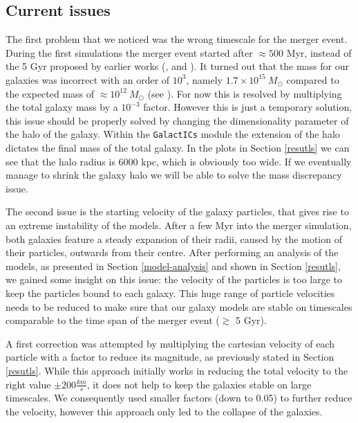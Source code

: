 \documentclass[a4paper,12pt, english]{article}
\begin{document}
\subsection{Current issues}
The first problem that we noticed was the wrong timescale for the merger event. During the first simulations the merger event started after \(\approx 500\) Myr, instead of the 5 Gyr proposed by earlier works (\textcite{Cox_2008},\textcite{van_der_Marel_2019} and \textcite{Schiavi_2019}). It turned out that the mass for our galaxies was incorrect with an order of $10^3$, namely \(1.7 \times 10^{15}\: M_{\odot}\) compared to the expected mass of \(\approx 10^{12}\: M_{\odot}\) (see \textcite{Watkins_2019}). For now this is resolved by multiplying the total galaxy mass by a  $10^{-3}$ factor. However this is just a temporary solution, this issue should be properly solved by changing the dimensionality parameter of the halo of the galaxy. Within the \texttt{GalactICs} module the extension of the halo dictates the final mass of the total galaxy. In the plots in Section \ref{resutls} we can see that the halo radius is 6000 kpc, which is obviously too wide. If we eventually manage to shrink the galaxy halo we will be able to solve the mass discrepancy issue.\par
\smallskip
The second issue is the starting velocity of the galaxy particles, that gives rise to an extreme instability of the models. After a few Myr into the merger simulation, both galaxies feature a steady expansion of their radii, caused by the motion of their particles, outwards from their centre. After performing an analysis of the models, as presented in Section \ref{model-analysis} and shown in Section \ref{resutls}, we gained some insight on this issue: the velocity of the particles is too large to keep the particles bound to each galaxy. This huge range of particle velocities needs to be reduced to make sure that our galaxy models are stable on timescales comparable to the time span of the merger event (\(\gtrsim\) 5 Gyr).\par
\smallskip
A first correction was attempted by multiplying the cartesian velocity of each particle with a factor to reduce its magnitude, as previously stated in Section \ref{resutls}. While this approach initially works in reducing the total velocity to the right value $\pm 200\frac{km}{s}$, it does not help to keep the galaxies stable on large timescales. We consequently used smaller factors (down to 0.05) to further reduce the velocity, however this approach only led to the collapse of the galaxies.\par
\end{document}
